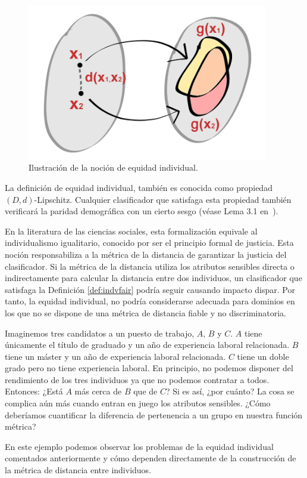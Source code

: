 \documentclass[oneside,openright,titlepage,numbers=noenddot,openany,headinclude,footinclude=true,
cleardoublepage=empty,abstractoff,BCOR=5mm,paper=a4,fontsize=12pt,main=spanish]{scrreprt}
\begin{document}
\begin{figure}[h]
	\centering
	\includegraphics[width=10.5cm]{individual_fair.jpg}
	\caption{Ilustración de la noción de equidad individual.}
    \label{fig:individual_fairness}
\end{figure}

La definición de equidad individual, también es conocida como propiedad $(D,d)$-Lipschitz. Cualquier clasificador que satisfaga esta propiedad también verificará la paridad demográfica con un cierto sesgo (véase Lema 3.1 en~\cite{detect2012}).

En la literatura de las ciencias sociales, esta formalización
equivale al individualismo igualitario, conocido por ser el principio formal de justicia. Esta noción responsabiliza a la métrica de la distancia de garantizar la justicia del clasificador. Si la métrica de la distancia utiliza los atributos sensibles directa o indirectamente para calcular la distancia entre dos individuos, un clasificador que satisfaga la Definición \ref{def:indvfair} podría seguir causando impacto dispar. Por tanto, la equidad individual, no podría considerarse adecuada para dominios en los que no se dispone de una métrica de distancia fiable y no discriminatoria.

\begin{example}
Imaginemos tres candidatos a un puesto de trabajo, $A$, $B$ y $C$. $A$ tiene únicamente el título de graduado y un año de experiencia laboral relacionada. $B$ tiene un máster y un año de experiencia laboral relacionada. $C$ tiene un doble grado pero no tiene experiencia laboral. En principio, no podemos disponer del rendimiento de los tres individuos ya que no podemos contratar a todos. Entonces: ¿Está $A$ más cerca de $B$ que de $C$? Si es así, ¿por cuánto? La cosa se complica aún más cuando entran en juego los atributos sensibles. ¿Cómo deberíamos cuantificar la diferencia de pertenencia a un grupo en nuestra función métrica?

En este ejemplo podemos observar los problemas de la equidad individual comentados anteriormente y cómo dependen directamente de la construcción de la métrica de distancia entre individuos.
\end{example}
\end{document}
